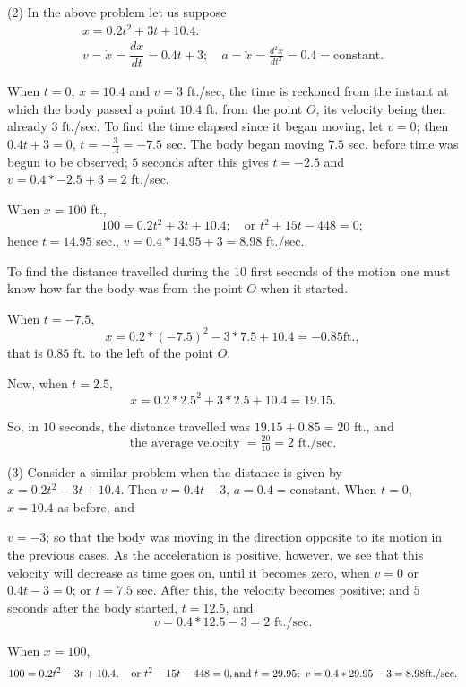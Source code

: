 \documentclass{ximera}
\begin{document}
(2) In the above problem let us suppose
\begin{gather*}
x = 0.2t^2 + 3t + 10.4.\\
v = \dot{x} = \dfrac{dx}{dt} = 0.4t + 3;\quad a = \ddot{x} = \frac{d^2x}{dt^2} = 0.4 = \text{constant}.
\end{gather*}

When $t = 0$, $x = 10.4$ and $v = 3$ ft./sec, the time is
reckoned from the instant at which the body passed a
point $10.4$ ft. from the point $O$, its velocity being then
already $3$ ft./sec. To find the time elapsed since it began
moving, let $v = 0$; then $0.4t + 3 = 0$, $t= -\frac{3}{.4}
= -7.5$ sec.
The body began moving $7.5$ sec. before time was
begun to be observed; $5$ seconds after this gives
$t = -2.5$ and $v = 0.4 * -2.5 + 3 = 2$ ft./sec.

When $x = 100$ ft.,
\[
100 = 0.2t^2 + 3t + 10.4;\quad \text{or } t^2 + 15t - 448 = 0;
\]
hence $t = 14.95$ sec., $v = 0.4 * 14.95 + 3 = 8.98$ ft./sec.

To find the distance travelled during the $10$ first
seconds of the motion one must know how far the
body was from the point $O$ when it started.

When $t = -7.5$,
\[
x = 0.2 * (-7.5)^2 - 3 * 7.5 + 10.4 = -0.85 \text{ft}.,
\]
that is $0.85$ ft. to the left of the point $O$.

Now, when $t = 2.5$,
\[
x = 0.2 * 2.5^2 + 3 * 2.5 + 10.4 = 19.15.
\]

So, in $10$ seconds, the distance travelled was
$19.15 + 0.85 = 20$ ft., and
\[
\text{the average velocity } = \tfrac{20}{10} = 2 \text{ ft./sec}.
\]

(3) Consider a similar problem when the distance
is given by $x = 0.2t^2 - 3t + 10.4$. Then $v = 0.4t - 3$,
$a = 0.4 = \text{constant}$. When $t = 0$, $x = 10.4$ as before, and

$v = -3$; so that the body was moving in the direction
opposite to its motion in the previous cases. As the
acceleration is positive, however, we see that this
velocity will decrease as time goes on, until it becomes
zero, when $v = 0$ or $0.4t - 3 = 0$; or $t = 7.5$ sec. After
this, the velocity becomes positive; and $5$ seconds
after the body started, $t = 12.5$, and
\[
v = 0.4 * 12.5 - 3 = 2 \text{ ft./sec}.
\]

When $x = 100$,
\[
100 = 0.2t^2 - 3t + 10.4,\quad \text{or } t^2 - 15t - 448 = 0, \\
 \text{and}\;
t = 29.95;\ v = 0.4 * 29.95 - 3 = 8.98 \text{ft./sec.}
\]
\end{document}

